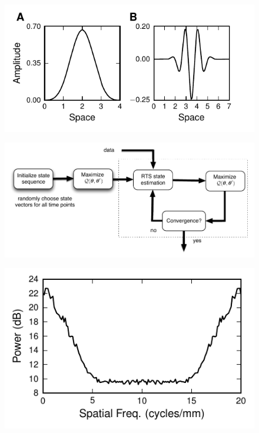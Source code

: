 \documentclass[review,authoryear,3p]{elsarticle}
\begin{document}
  \clearpage
  \newpage
  \begin{figure}[!t]
  \centering
  \includegraphics{Graph/fig4.pdf}
  \caption{}
  \label{fig:MRA-Figure1}
  \end{figure}
  \clearpage
  \newpage 
  \begin{figure}[!t]
  \centering
  \includegraphics[scale=1]{Graph/fig5.pdf}
  \caption{}
  \label{fig:EMBlockDiagram}
  \end{figure}
  \clearpage
  \newpage 
  \begin{figure}[!t]
   	\centering
   		\includegraphics[scale=1]{Graph/fig6.pdf}
   		\caption{}  
  \label{fig:ObservationFrequencyResponce} 
   \end{figure}
\end{document}
